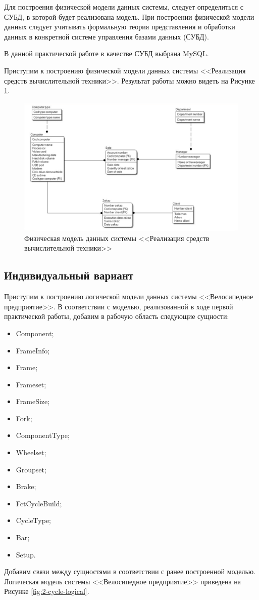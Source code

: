 \documentclass[a4paper,14pt]{extarticle}
\newcommand{\individual}{Индивидуальный вариант~}
\begin{document}
Для построения физической модели данных системы, следует определиться с СУБД, в которой будет реализована модель. При построении физической модели данных следует учитывать формальную теория представления и обработки данных в конкретной системе управления базами данных (СУБД).

В данной практической работе в качестве СУБД выбрана MySQL.

Приступим к построению физической модели данных системы <<Реализация средств вычислительной техники>>. Результат работы можно видеть на Рисунке \ref{fig:2-phisical-model}.

\begin{figure}[h!]
	\centering
	\includegraphics[width=0.7\linewidth]{images/2-phisical-model}
	\caption{Физическая модель данных системы <<Реализация средств вычислительной техники>>}
	\label{fig:2-phisical-model}
\end{figure}
\newpage
\subsection{\individual}
Приступим к построению логической модели данных системы <<Велосипедное предприятие>>. 
В соответствии с моделью, реализованной в ходе первой практической работы, добавим в рабочую область следующие сущности:
\begin{itemize}
	\item Component;
	\item FrameInfo;
	\item Frame;
	\item Frameset;
	\item FrameSize;
	\item Fork;
	\item ComponentType;
	\item Wheelset;
	\item Groupset;
	\item Brake;
	\item FctCycleBuild;
	\item CycleType;
	\item Bar;
	\item Setup.
\end{itemize}
Добавим связи между сущностями в соответствии с ранее построенной моделью. Логическая модель системы <<Велосипедное предприятие>> приведена на Рисунке \ref{fig:2-cycle-logical}.
\end{document}
